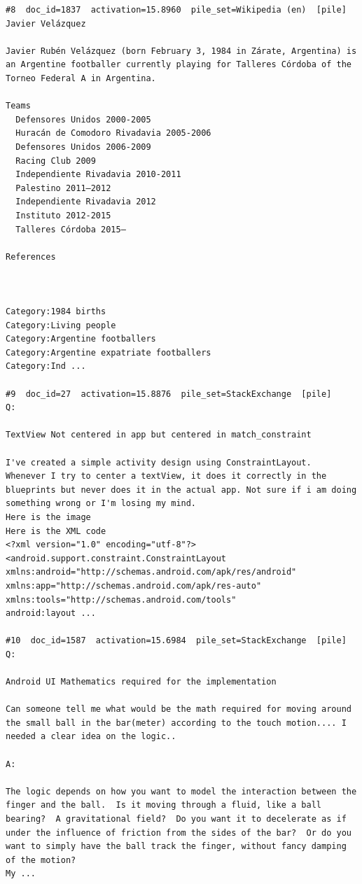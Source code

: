 \begin{verbatim}
#8  doc_id=1837  activation=15.8960  pile_set=Wikipedia (en)  [pile]
Javier Velázquez

Javier Rubén Velázquez (born February 3, 1984 in Zárate, Argentina) is an Argentine footballer currently playing for Talleres Córdoba of the Torneo Federal A in Argentina.

Teams
  Defensores Unidos 2000-2005
  Huracán de Comodoro Rivadavia 2005-2006
  Defensores Unidos 2006-2009
  Racing Club 2009
  Independiente Rivadavia 2010-2011
  Palestino 2011–2012
  Independiente Rivadavia 2012
  Instituto 2012-2015
  Talleres Córdoba 2015–

References
 
 

Category:1984 births
Category:Living people
Category:Argentine footballers
Category:Argentine expatriate footballers
Category:Ind ...

#9  doc_id=27  activation=15.8876  pile_set=StackExchange  [pile]
Q:

TextView Not centered in app but centered in match_constraint

I've created a simple activity design using ConstraintLayout.
Whenever I try to center a textView, it does it correctly in the blueprints but never does it in the actual app. Not sure if i am doing something wrong or I'm losing my mind.
Here is the image
Here is the XML code
<?xml version="1.0" encoding="utf-8"?>
<android.support.constraint.ConstraintLayout 
xmlns:android="http://schemas.android.com/apk/res/android"
xmlns:app="http://schemas.android.com/apk/res-auto"
xmlns:tools="http://schemas.android.com/tools"
android:layout ...

#10  doc_id=1587  activation=15.6984  pile_set=StackExchange  [pile]
Q:

Android UI Mathematics required for the implementation

Can someone tell me what would be the math required for moving around the small ball in the bar(meter) according to the touch motion.... I needed a clear idea on the logic..

A:

The logic depends on how you want to model the interaction between the finger and the ball.  Is it moving through a fluid, like a ball bearing?  A gravitational field?  Do you want it to decelerate as if under the influence of friction from the sides of the bar?  Or do you want to simply have the ball track the finger, without fancy damping of the motion?
My ...

\end{verbatim}

